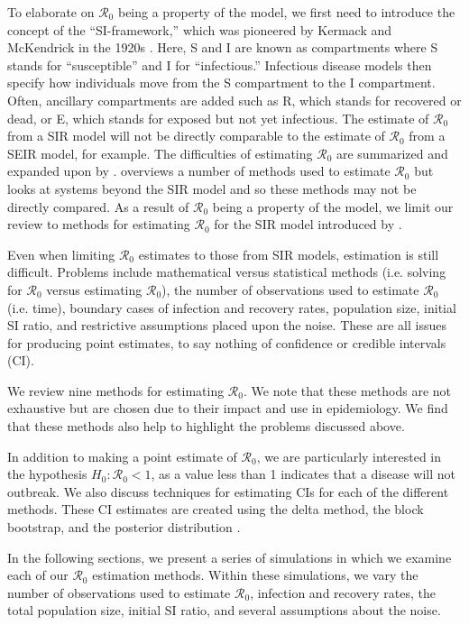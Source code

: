 \documentclass[12pt]{article}
\newcommand{\wxxsir}{nine } %
\newcommand{\rr}{\ensuremath{\mathcal{R}_0}}
\begin{document}
To elaborate on $\rr$ being a property of the model, we first need to introduce the concept of the ``SI-framework,'' which was pioneered by Kermack and McKendrick in the 1920s \citep{getz2006}.   Here, S and I are known as compartments where S stands for ``susceptible'' and I for ``infectious.'' Infectious disease models then specify how individuals move from the S compartment to the I compartment.  Often, ancillary compartments are added such as R, which stands for recovered or dead, or E, which stands for exposed but not yet infectious.  The estimate of $\rr$ from a SIR model will not be directly comparable to the estimate of $\rr$ from a SEIR model, for example.  The difficulties of estimating $\rr$ are summarized and expanded upon by \cite{li2011}.  \cite{driessche2017} overviews a number of methods used to estimate $\rr$ but looks at systems beyond the SIR model and so these methods may not be directly compared.   As a result of $\rr$ being a property of the model, we limit our review to methods for estimating $\rr$ for the SIR model introduced by \cite{Kermack700}.

Even when limiting $\rr$ estimates to those from SIR models, estimation is still difficult.  Problems include mathematical versus statistical methods (i.e. solving for $\rr$ versus estimating $\rr$), the number of observations used to estimate $\rr$ (i.e. time), boundary cases of infection and recovery rates, population size, initial SI ratio, and restrictive assumptions placed upon the noise.  These are all issues for producing point estimates, to say nothing of confidence or credible intervals (CI).

We review \wxxsir methods for estimating $\rr$.  We note that these methods are not exhaustive but are chosen due to their impact and use in epidemiology.  We find that these methods also help to highlight the problems discussed above.

In addition to making a point estimate of $\rr$, we are particularly interested in the hypothesis  $H_0: \rr < 1$, as a value less than 1 indicates that a disease will not outbreak.  We also discuss techniques for estimating CIs for each of the different methods.  These CI estimates are created using the delta method, the block bootstrap, and the posterior distribution \citep{cao1999,wasserman2004}.

In the following sections, we present a series of simulations in which we examine each of our $\rr$ estimation methods.  Within these simulations, we vary the number of observations used to estimate $\rr$, infection and recovery rates, the total population size, initial SI ratio, and several assumptions about the noise.
\end{document}
